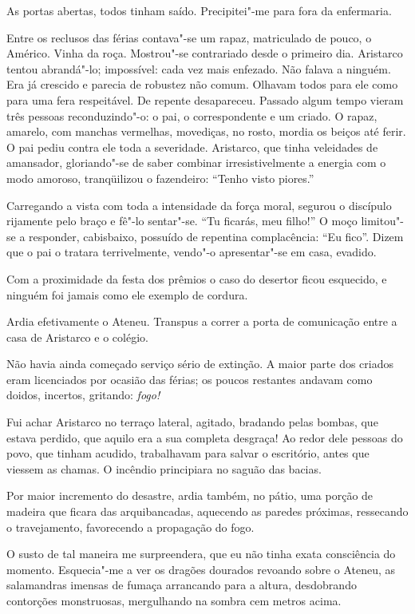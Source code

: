 As portas abertas, todos tinham saído. Precipitei"-me para
fora da enfermaria. 

Entre os reclusos das férias contava"-se um rapaz,
matriculado de pouco, o Américo. Vinha da roça. Mostrou"-se
contrariado desde o primeiro dia. Aristarco tentou abrandá"-lo;
impossível: cada vez mais enfezado. Não falava a ninguém. Era já
crescido e parecia de robustez não comum. Olhavam todos para ele como
para uma fera respeitável. De repente desapareceu. Passado algum tempo
vieram três pessoas reconduzindo"-o: o pai, o correspondente e um
criado. O rapaz, amarelo, com manchas vermelhas, movediças, no rosto,
mordia os beiços até ferir. O pai pediu contra ele toda a severidade.
Aristarco, que tinha veleidades de amansador, gloriando"-se de saber
combinar irresistivelmente a energia com o modo amoroso, tranqüilizou o
fazendeiro: ``Tenho visto piores.'' 

Carregando a vista com toda a
intensidade da força moral, segurou o discípulo rijamente pelo braço e
fê"-lo sentar"-se. ``Tu ficarás, meu filho!'' O moço limitou"-se a
responder, cabisbaixo, possuído de repentina complacência: ``Eu fico''.
Dizem que o pai o tratara terrivelmente, vendo"-o apresentar"-se em
casa, evadido. 

Com a proximidade da festa dos prêmios o caso do
desertor ficou esquecido, e ninguém foi jamais como ele exemplo de
cordura. 

Ardia efetivamente o Ateneu. Transpus a correr a porta de
comunicação entre a casa de Aristarco e o colégio. 

Não havia ainda
começado serviço sério de extinção. A maior parte dos criados eram
licenciados por ocasião das férias; os poucos restantes andavam como
doidos, incertos, gritando: \textit{fogo!}

Fui achar Aristarco no terraço
lateral, agitado, bradando pelas bombas, que estava perdido, que aquilo
era a sua completa desgraça! Ao redor dele pessoas do povo, que tinham
acudido, trabalhavam para salvar o escritório, antes que viessem as
chamas. O incêndio principiara no saguão das bacias. 

Por maior incremento do desastre, ardia também, 
no pátio, uma porção de madeira
que ficara das arquibancadas, aquecendo as paredes próximas, ressecando
o travejamento, favorecendo a propagação do fogo. 

O susto de tal
maneira me surpreendera, que eu não tinha exata consciência do momento.
Esquecia"-me a ver os dragões dourados revoando sobre o Ateneu, as
salamandras imensas de fumaça arrancando para a altura, desdobrando
contorções monstruosas, mergulhando na sombra cem metros acima. 

